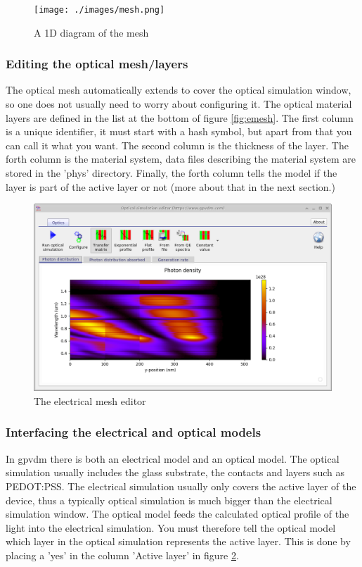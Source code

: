 \begin{figure}[ht!]
\centering
\texttt{[image: ./images/mesh.png]}
\caption{A 1D diagram of the mesh}
\label{fig:emeshdiagram}
\end{figure}


\subsubsection{Editing the optical mesh/layers}
The optical mesh automatically extends to cover the optical simulation window, so one does not usually need to worry about configuring it.  The optical material layers are defined in the list at the bottom of figure \ref{fig:emesh}.  The first column is a unique identifier, it must start with a hash symbol, but apart from that you can call it what you want.  The second column is the thickness of the layer.  The forth column is the material system, data files describing the material system are stored in the 'phys' directory.  Finally, the forth column tells the model if the layer is part of the active layer or not (more about that in the next section.)

\begin{figure}[ht!]
\centering
\includegraphics[width=\textwidth]{./images/opticalsimulation.png}
\caption{The electrical mesh editor}
\label{fig:opticalsimulation}
\end{figure}

\subsubsection{Interfacing the electrical and optical models}
In gpvdm there is both an electrical model and an optical model.  The optical simulation usually includes the glass substrate, the contacts and layers such as PEDOT:PSS.  The electrical simulation usually only covers the active layer of the device, thus a typically optical simulation is much bigger than the electrical simulation window.  The optical model feeds the calculated optical profile of the light into the electrical simulation.  You must therefore tell the optical model which layer in the optical simulation represents the active layer.  This is done by placing a 'yes' in the column 'Active layer' in figure \ref{fig:opticalsimulation}.
\newpage
\vfill
